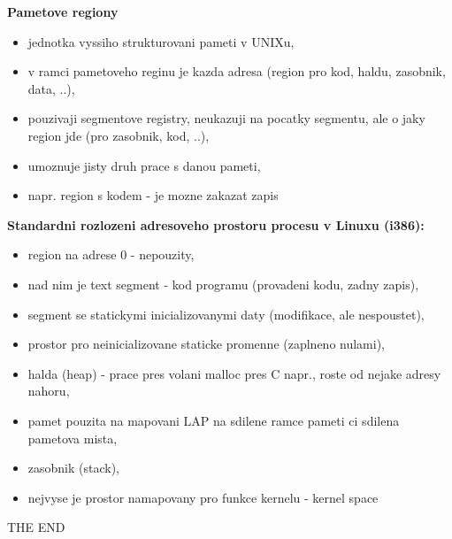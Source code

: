 \documentclass[a4paper, 11pt]{article}
\begin{document}
\textbf{Pametove regiony}
\begin{itemize}
    \item jednotka vyssiho strukturovani pameti v UNIXu,
    \item v ramci pametoveho reginu je kazda adresa (region pro kod, haldu, zasobnik, data, ..),
    \item pouzivaji segmentove registry, neukazuji na pocatky segmentu, ale o jaky region jde (pro zasobnik, kod, ..),
    \item umoznuje jisty druh prace s danou pameti,
    \item napr. region s kodem - je mozne zakazat zapis \\
\end{itemize}

\textbf{Standardni rozlozeni adresoveho prostoru procesu v Linuxu (i386):}
\begin{itemize}
    \item region na adrese 0 - nepouzity,
    \item nad nim je text segment - kod programu (provadeni kodu, zadny zapis),
    \item segment se statickymi inicializovanymi daty (modifikace, ale nespoustet),
    \item prostor pro neinicializovane staticke promenne (zaplneno nulami),
    \item halda (heap) - prace pres volani malloc pres C napr., roste od nejake adresy nahoru,
    \item pamet pouzita na mapovani LAP na sdilene ramce pameti ci sdilena pametova mista,
    \item zasobnik (stack),
    \item nejvyse je prostor namapovany pro funkce kernelu - kernel space \\
\end{itemize}

\newpage

{\Huge THE END}
\end{document}
